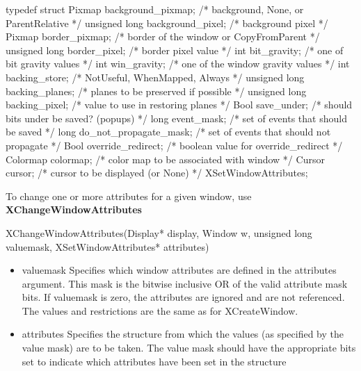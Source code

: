 \documentclass{report}
\begin{document}
\begin{itemize}
\begin{cppcode}
                typedef struct {
                    Pixmap background_pixmap;       /* background, None, or ParentRelative */
                    unsigned long background_pixel; /* background pixel */
                    Pixmap border_pixmap;           /* border of the window or CopyFromParent */
                    unsigned long border_pixel;     /* border pixel value */
                    int bit_gravity;                /* one of bit gravity values */
                    int win_gravity;                /* one of the window gravity values */
                    int backing_store;              /* NotUseful, WhenMapped, Always */
                    unsigned long backing_planes;   /* planes to be preserved if possible */
                    unsigned long backing_pixel;    /* value to use in restoring planes */
                    Bool save_under;                /* should bits under be saved? (popups) */
                    long event_mask;                /* set of events that should be saved */
                    long do_not_propagate_mask;     /* set of events that should not propagate */
                    Bool override_redirect;         /* boolean value for override_redirect */
                    Colormap colormap;              /* color map to be associated with window */
                    Cursor cursor;                  /* cursor to be displayed (or None) */
                } XSetWindowAttributes;
            \end{cppcode}
            \bigbreak \noindent 
            To change one or more attributes for a given window, use \textbf{XChangeWindowAttributes}
            \bigbreak \noindent 
            \begin{cppcode}
                XChangeWindowAttributes(Display* display, Window w, unsigned long valuemask, XSetWindowAttributes* attributes)
            \end{cppcode}
            \begin{itemize}
                \item valuemask Specifies which window attributes are defined in the attributes argument. This mask is the bitwise inclusive OR of the valid attribute mask bits. If valuemask is zero, the attributes are ignored and are not referenced. The values and restrictions are the same as for XCreateWindow.
                \item attributes Specifies the structure from which the values (as specified by the value mask) are to be taken. The value mask should have the appropriate bits set to indicate which attributes have been set in the structure

\end{itemize}
\end{itemize}
\end{document}
